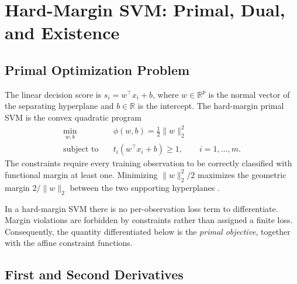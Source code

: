 \documentclass[11pt,a4paper]{article}
\numberwithin{equation}{section} %
\begin{document}
\section{Hard-Margin SVM: Primal, Dual, and Existence}
\label{sec:hard-margin}

\subsection{Primal Optimization Problem}

The linear decision score is $s_i=w^\top x_i+b$, where $w\in\mathbb{R}^p$ is the normal vector of the separating hyperplane and $b\in\mathbb{R}$ is the intercept. The hard-margin primal SVM is the convex quadratic program \cite{cortes1995,lec-statlearn,lec-convex}
\begin{equation}
\begin{aligned}
\min_{w,b}\quad & \phi(w,b)=\frac{1}{2}\lVert w\rVert_2^2\\
\text{subject to}\quad & t_i(w^\top x_i+b)\geq 1,
    \qquad i=1,\ldots,m.
\end{aligned}
\end{equation}
The constraints require every training observation to be correctly classified with functional margin at least one. Minimizing $\lVert w\rVert_2^2/2$ maximizes the geometric margin $2/\lVert w\rVert_2$ between the two supporting hyperplanes \cite{lec-statlearn}.

In a hard-margin SVM there is no per-observation loss term to differentiate. Margin violations are forbidden by constraints rather than assigned a finite loss. Consequently, the quantity differentiated below is the \emph{primal objective}, together with the affine constraint functions.

\subsection{First and Second Derivatives}
\end{document}

